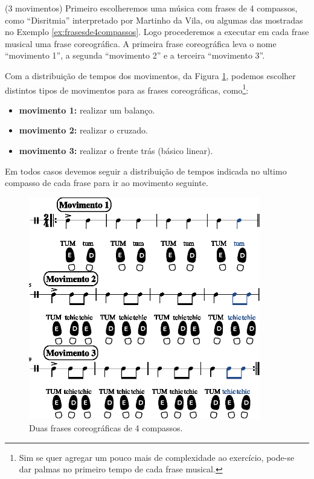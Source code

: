 \begin{example}(3 movimentos)
Primeiro escolheremos uma música com frases de 4 compassos, 
como ``Disritmia'' interpretado por Martinho da Vila,
ou algumas das mostradas no Exemplo \ref{ex:frasesde4compassos}.
Logo procederemos a executar em cada frase musical uma frase coreográfica.
A primeira frase coreográfica leva o nome ``movimento 1'', 
a segunda ``movimento 2''  e a terceira ``movimento 3''.


Com a distribuição de tempos dos movimentos, da Figura \ref{fig:frasecoreografica2a}, 
podemos escolher distintos tipos de movimentos para as frases coreográficas, 
como\footnote{Sim 
se quer agregar um pouco mais de complexidade ao exercício,
pode-se dar palmas no primeiro tempo de cada frase musical.}:
\begin{itemize}
\item \textbf{movimento 1:} realizar um balanço.
\item \textbf{movimento 2:} realizar o cruzado.
\item \textbf{movimento 3:} realizar o frente trás (básico linear).
\end{itemize}
Em todos casos devemos seguir a distribuição de tempos indicada no ultimo compasso de cada frase para ir ao movimento seguinte.

\end{example}

\begin{figure}[!h]
    \centering
    \includegraphics[width=0.9\textwidth]{chapters/cap-musicalidade/treino-fraseio2a-1.eps}
    \caption{Duas frases coreográficas de 4 compassos.}
    \label{fig:frasecoreografica2a}
\end{figure}

